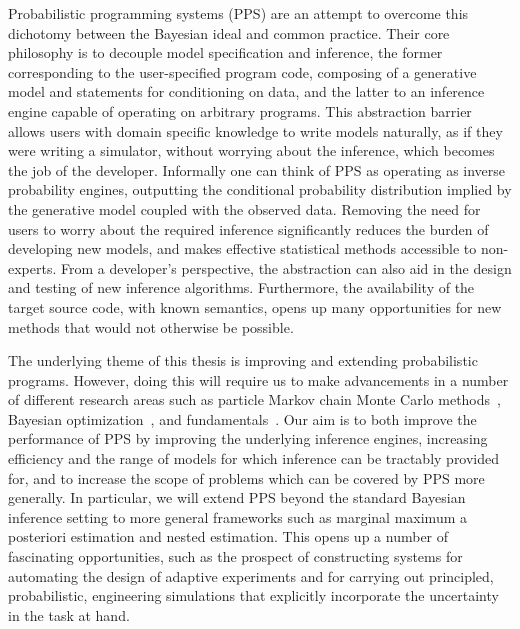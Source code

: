 Probabilistic programming systems (PPS) \citep{goodman2008church} are an attempt to
overcome this dichotomy between the Bayesian ideal and common practice.  Their core philosophy 
is to decouple model specification and inference, the former corresponding to the user-specified 
program code, composing of a generative model and statements for conditioning on data, and the 
latter to an inference engine capable of operating on arbitrary programs.  This abstraction barrier 
allows users with domain specific knowledge to write models naturally, as if they were writing a 
simulator, without worrying about the inference, which becomes the job of the developer. Informally 
one can think of PPS as operating as inverse probability engines, outputting the conditional 
probability distribution implied by the generative model coupled with the observed data.
Removing the need for users to worry about the required inference significantly reduces the 
burden of developing new models, and makes effective statistical methods accessible to 
non-experts.  From a developer's perspective, the abstraction can also aid in the design 
and testing of new inference algorithms.  Furthermore, the availability of the target source 
code, with known semantics, opens up many opportunities for new methods that would
not otherwise be possible.

The underlying theme of this thesis is improving and extending probabilistic programs.  However,
doing this will require us to make advancements in a number of different research areas such
as particle Markov chain Monte Carlo methods~\citep{andrieu2010particle,rainforth2016interacting},
Bayesian optimization~\citep{movckus1975bayesian,rainforth2016bayesian}, and \mc
fundamentals~\cite{metropolis1949monte,rainforth2017pitfalls}.  Our aim is to both improve
the performance of PPS by improving the underlying inference engines, increasing
efficiency and the range of models for which inference can be tractably provided for, and to increase
the scope of problems which can be covered by PPS more generally.  In particular, we
will extend PPS beyond the standard Bayesian inference setting to more general frameworks
such as marginal maximum a posteriori estimation and nested estimation.  This opens up a number
of fascinating opportunities, such as the prospect of constructing systems for automating the
design of adaptive experiments and for carrying out principled, probabilistic, engineering simulations
that explicitly incorporate the uncertainty in the task at hand.

